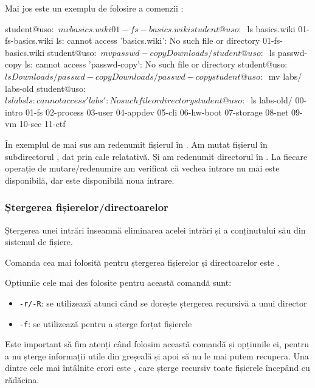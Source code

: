 Mai jos este un exemplu de folosire a comenzii :

\begin{screen}
student@uso:~$ mv basics.wiki 01-fs-basics.wiki
student@uso:~$ ls basics.wiki 01-fs-basics.wiki
ls: cannot access 'basics.wiki': No such file or directory
01-fs-basics.wiki
student@uso:~$ mv passwd-copy Downloads/
student@uso:~$ ls passwd-copy
ls: cannot access 'passwd-copy': No such file or directory
student@uso:~$ ls Downloads/passwd-copy
Downloads/passwd-copy
student@uso:~$ mv labs/ labs-old
student@uso:~$ ls labs
ls: cannot access 'labs': No such file or directory
student@uso:~$ ls labs-old/
00-intro  01-fs  02-process  03-user  04-appdev  05-cli  06-hw-boot  07-storage  08-net  09-vm  10-sec  11-ctf
\end{screen}

În exemplul de mai sus am redenumit fișierul  în . Am mutat fișierul  în subdirectorul , dat prin cale relatativă. Și am redenumit directorul  în . La fiecare operație de mutare/redenumire am verificat că vechea intrare nu mai este disponibilă, dar este disponibilă noua intrare.

\subsubsection{Ștergerea fișierelor/directoarelor}
\label{sec:file-system-file-rm}

Ștergerea unei intrări înseamnă eliminarea acelei intrări și a conținutului său din sistemul de fișiere.

Comanda cea mai folosită pentru ștergerea fișierelor și directoarelor este
.

Opțiunile cele mai des folosite pentru această comandă sunt:

\begin{itemize}
	\item \texttt{-r/-R}: se utilizează atunci când se dorește ștergerea recursivă a unui director
	\item \texttt{-f}: se utilizează pentru a șterge forțat fișierele
\end{itemize}

Este important să fim atenți când folosim această comandă și opțiunile ei,
pentru a nu șterge informații utile din greșeală și apoi să nu le mai putem
recupera. Una dintre cele mai întâlnite erori este , care șterge
recursiv toate fișierele începând cu rădăcina.

